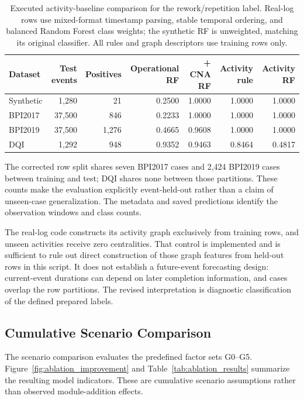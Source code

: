 \begin{table}[t]
\caption{Executed activity-baseline comparison for the rework/repetition label. Real-log rows use mixed-format timestamp parsing, stable temporal ordering, and balanced Random Forest class weights; the synthetic RF is unweighted, matching its original classifier. All rules and graph descriptors use training rows only.}
\label{tab:real_activity_audit}
\centering\small
\begin{tabular}{lrrrrrr}
\toprule
Dataset & Test events & Positives & Operational RF & + CNA RF & Activity rule & Activity RF\\
\midrule
Synthetic & 1,280 & 21 & 0.2500 & 1.0000 & 1.0000 & 1.0000 \\
BPI2017 & 37,500 & 846 & 0.2233 & 1.0000 & 1.0000 & 1.0000 \\
BPI2019 & 37,500 & 1,276 & 0.4665 & 0.9608 & 1.0000 & 1.0000 \\
DQI & 1,292 & 948 & 0.9352 & 0.9463 & 0.8464 & 0.4817 \\
\bottomrule
\end{tabular}
\end{table}

The corrected row split shares seven BPI2017 cases and 2,424 BPI2019 cases between training and test; DQI shares none between those partitions. These counts make the evaluation explicitly event-held-out rather than a claim of unseen-case generalization. The metadata and saved predictions identify the observation windows and class counts.

The real-log code constructs its activity graph exclusively from training rows, and unseen activities receive zero centralities. That control is implemented and is sufficient to rule out direct construction of those graph features from held-out rows in this script. It does not establish a future-event forecasting design: current-event durations can depend on later completion information, and cases overlap the row partitions. The revised interpretation is diagnostic classification of the defined prepared labels.

\subsection{Cumulative Scenario Comparison}
\label{subsec:ablation_results}

The scenario comparison evaluates the predefined factor sets G0--G5. Figure~\ref{fig:ablation_improvement} and Table~\ref{tab:ablation_results} summarize the resulting model indicators. These are cumulative scenario assumptions rather than observed module-addition effects.

